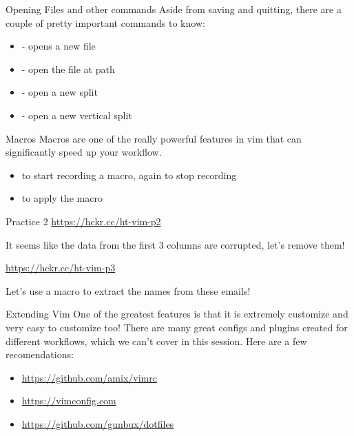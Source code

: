 \documentclass[12pt]{beamer}
\begin{document}
\begin{frame}{Opening Files and other commands}
    Aside from saving and quitting, there are a couple of pretty important commands to know:
    \begin{itemize}
        \item {} - opens a new file
        \item {} - open the file at path
        \item {} - open a new split
        \item {} - open a new vertical split
    \end{itemize}{}
\end{frame}{}

\begin{frame}{Macros}
    Macros are one of the really powerful features in vim that can significantly speed up your workflow.
    \begin{itemize}
        \item {} to start recording a macro,  again to stop recording
        \item {} to apply the macro
    \end{itemize}{}

\end{frame}{}
    
\begin{frame}{Practice 2}
    \url{https://hckr.cc/ht-vim-p2}

    It seems like the data from the first 3 columns are corrupted, let's remove them!

    \url{https://hckr.cc/ht-vim-p3}

    Let's use a macro to extract the names from these emails!
\end{frame}{}

\begin{frame}{Extending Vim}
    One of the greatest features is that it is extremely customize and very easy to customize too!
    There are many great configs and plugins created for different workflows, which we can't cover in this
    session. Here are a few recomendations:

    \begin{itemize}
        \item \url{https://github.com/amix/vimrc}
        \item \url{https://vimconfig.com}
        \item \url{https://github.com/gunbux/dotfiles}
    \end{itemize}{}
\end{frame}{}
\end{document}

